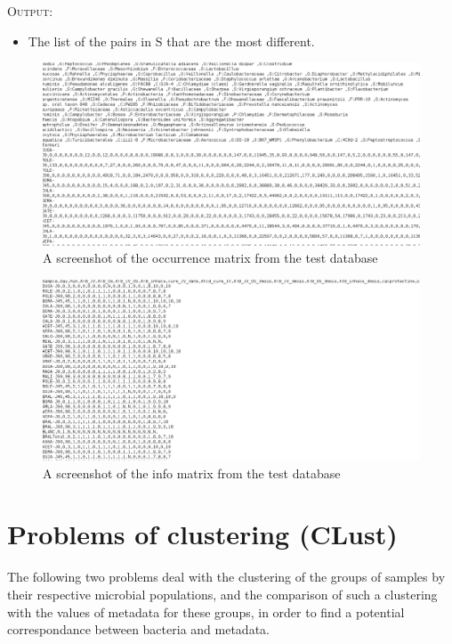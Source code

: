 \documentclass{report}
\begin{document}
\bigskip

\textsc{Output:} \begin{itemize}
                 \item The list of the pairs in \textsc{S} that are the most different.
                 \end{itemize}

\begin{figure}[H]
\centering
\includegraphics[scale=0.3]{illustrations/occmatrix.png} 
\caption{A screenshot of the occurrence matrix from the test database}
\end{figure}

\begin{figure}[H]
\centering
\includegraphics[scale=0.3]{illustrations/infomatrix.png}
\caption{A screenshot of the info matrix from the test database}
\end{figure}

\section{Problems of clustering (CLust)}

The following two problems deal with the clustering of the groups of samples by their respective microbial populations, and the comparison of such a clustering with the values of metadata for these groups, in order to find a potential correspondance between bacteria and metadata. 
\end{document}
